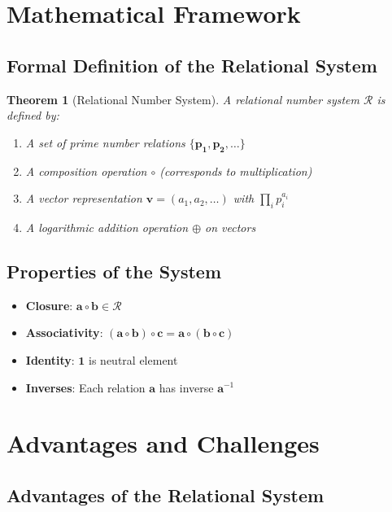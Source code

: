 \documentclass[11pt,a4paper]{article}
\newcommand{\primrel}[1]{\mathbf{#1}}
\newcommand{\vect}[1]{\boldsymbol{#1}}
\newtheorem{theorem}{Theorem}[section]
\begin{document}
	\section{Mathematical Framework}
	
	\subsection{Formal Definition of the Relational System}
	
	\begin{theorem}[Relational Number System]
		A relational number system $\mathcal{R}$ is defined by:
		\begin{enumerate}
			\item A set of prime number relations $\{\primrel{p_1}, \primrel{p_2}, \ldots\}$
			\item A composition operation $\circ$ (corresponds to multiplication)
			\item A vector representation $\vect{v} = (a_1, a_2, \ldots)$ with $\prod_i p_i^{a_i}$
			\item A logarithmic addition operation $\oplus$ on vectors
		\end{enumerate}
	\end{theorem}
	
	\subsection{Properties of the System}
	
	\begin{itemize}
		\item \textbf{Closure}: $\primrel{a} \circ \primrel{b} \in \mathcal{R}$
		\item \textbf{Associativity}: $(\primrel{a} \circ \primrel{b}) \circ \primrel{c} = \primrel{a} \circ (\primrel{b} \circ \primrel{c})$
		\item \textbf{Identity}: $\primrel{1}$ is neutral element
		\item \textbf{Inverses}: Each relation $\primrel{a}$ has inverse $\primrel{a}^{-1}$
	\end{itemize}
	
	\section{Advantages and Challenges}
	
	\subsection{Advantages of the Relational System}
	
\end{document}
